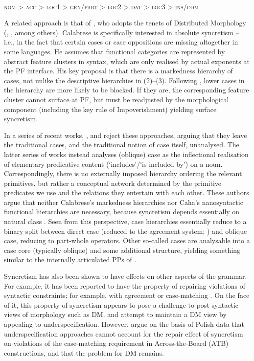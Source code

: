 \documentclass[output=paper]{langsci/langscibook}
\begin{document}
\ea%
\label{ex:intro:3}\citep[32]{Caha2009}\\
\textsc{nom > acc > loc1 > gen/part > loc2 > dat > loc3 > ins/com}
\z

A related approach is that of \citet{Calabrese2008}, who adopts the tenets of Distributed Morphology (\citealt{Halle1993b}, \citealt{Embick2006}, among others). Calabrese is specifically interested in absolute syncretism – i.e., in the fact that certain cases or case oppositions are missing altogether in some languages. He assumes that functional categories are represented by abstract feature clusters in syntax, which are only realised by actual exponents at the PF interface. His key proposal is that there is a markedness hierarchy of cases, not unlike the descriptive hierarchies in (2)–(3). Following \citet{Blake2001}, lower cases in the hierarchy are more likely to be blocked. If they are, the corresponding feature cluster cannot surface at PF, but must be readjusted by the morphological component (including the key rule of Impoverishment) yielding surface syncretism.

In a series of recent works, \citet{Manzini2011a}, \citet{Manzini2016} and \citet{Franco2017} reject these approaches, arguing that they leave the traditional cases, and the traditional notion of case itself, unanalysed. The latter series of works instead analyses (oblique) case as the inflectional realisation of elementary predicative content (‘includes’\slash ‘is included by’) on a noun. Correspondingly, there is no externally imposed hierarchy ordering the relevant primitives, but rather a conceptual network determined by the primitive predicates we use and the relations they entertain with each other. These authors argue that neither Calabrese’s markedness hierarchies nor Caha’s nanosyntactic functional hierarchies are necessary, because syncretism depends essentially on natural class \citep{Müller2007}. Seen from this perspective, case hierarchies essentially reduce to a binary split between direct case (reduced to the agreement system; \citealt{Chomsky2001}) and oblique case, reducing to part-whole operators. Other so-called cases are analysable into a case core (typically oblique) and some additional structure, yielding something similar to the internally articulated PPs of \citet{Svenonius2006}.

Syncretism has also been shown to have effects on other aspects of the grammar. For example, it has been reported to have the property of repairing violations of syntactic constraints; for example, with agreement \citep{Schütze2003,Bhatt2013} or case-matching \citep{Citko2005,Craenenbroeck2012,Hein2016}. On the face of it, this property of syncretism appears to pose a challenge to post-syntactic views of morphology such as DM. \citet{Citko2005} and \citet{Asarina2011} attempt to maintain a DM view by appealing to underspecification. However, \citet{Hein2016} argue on the basis of Polish data that underspecification approaches cannot account for the repair effect of syncretism on violations of the case-matching requirement in Across-the-Board (ATB) constructions, and that the problem for DM remains.
\end{document}
